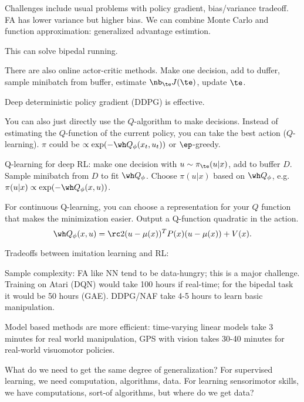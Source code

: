 Challenges include usual problems with policy gradient, bias/variance tradeoff. FA has lower variance but higher bias. We can combine Monte Carlo and function approximation: generalized advantage estimtion. %


This can solve bipedal running.

There are also online actor-critic methods. 
Make one decision, add to duffer, sample minibatch from buffer, estimate $\nb_\te J(\te)$, update $\te$. 

Deep deterministic policy gradient (DDPG) is effective.

You can also just directly use the $Q$-algorithm to make decisions. Instead of estimating the $Q$-function of the current policy, you can take the best action ($Q$-learning). $\pi$ could be $\propto \exp(-\wh Q_\phi(x_t,u_t))$ or $\ep$-greedy.

Q-learning for deep RL: make one decision with $u\sim \pi_\te(u|x)$, add to buffer $D$. Sample minibatch from $D$ to fit $\wh Q_\phi$. Choose $\pi(u|x)$ based on $\wh Q_\phi$, e.g. $\pi(u|x) \propto \exp(-\wh Q_\phi(x,u))$. 

For continuous Q-learning,  you can choose a representation for your $Q$ function that makes the minimization easier. Output a Q-function quadratic in the action.
$$\wh Q_\phi(x,u) = \rc 2(u-\mu(x))^TP(x)(u-\mu(x)) + V(x).$$
%


Tradeoffs between imitation learning and RL:

Sample complexity: FA like NN tend to be data-hungry; this is a major challenge. Training on Atari (DQN) would take 100 hours if real-time; for the bipedal task it would be 50 hours (GAE). DDPG/NAF take 4-5 hours to learn basic manipulation.

Model based methods are more efficient: time-varying linear models take 3 minutes for real world manipulation, GPS with vision takes 30-40 minutes for real-world visuomotor policies. 


What do we need to get the same degree of generalization?
For supervised learning, we need computation, algorithms, data. For learning sensorimotor skills, we have computations, sort-of algorithms, but where do we get data? 


